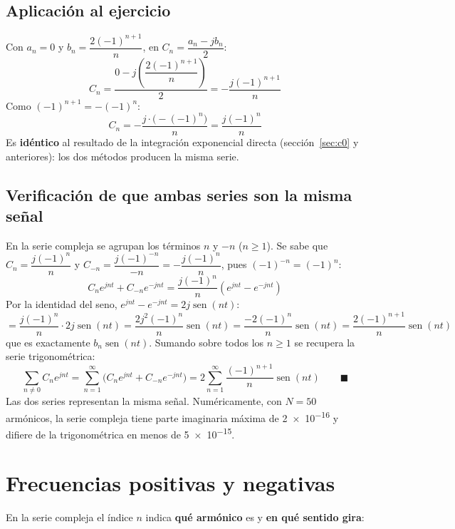 \documentclass[11pt,a4paper]{article}
\DeclareMathOperator{\sen}{sen}
\begin{document}
\subsection{Aplicación al ejercicio}
Con $a_n=0$ y $b_n=\dfrac{2(-1)^{n+1}}{n}$, en $C_n=\dfrac{a_n-jb_n}{2}$:
\begin{equation*}
  C_n=\frac{0-j\left(\dfrac{2(-1)^{n+1}}{n}\right)}{2}=-\frac{j(-1)^{n+1}}{n}
\end{equation*}
Como $(-1)^{n+1}=-(-1)^{n}$:
\begin{equation*}
  C_n=-\frac{j\cdot\big(-(-1)^{n}\big)}{n}=\boxed{\frac{j(-1)^{n}}{n}}
\end{equation*}
Es \textbf{idéntico} al resultado de la integración exponencial directa
(sección~\ref{sec:c0} y anteriores): los dos métodos producen la misma serie.

\subsection{Verificación de que ambas series son la misma señal}
En la serie compleja se agrupan los términos $n$ y $-n$ ($n\ge 1$). Se sabe que
$C_n=\dfrac{j(-1)^{n}}{n}$ y
$C_{-n}=\dfrac{j(-1)^{-n}}{-n}=-\dfrac{j(-1)^{n}}{n}$, pues $(-1)^{-n}=(-1)^{n}$:
\begin{equation*}
  C_ne^{jnt}+C_{-n}e^{-jnt}=\frac{j(-1)^{n}}{n}\left(e^{jnt}-e^{-jnt}\right)
\end{equation*}
Por la identidad del seno, $e^{jnt}-e^{-jnt}=2j\sen(nt)$:
\begin{equation*}
  =\frac{j(-1)^{n}}{n}\cdot 2j\sen(nt)
  =\frac{2j^{2}(-1)^{n}}{n}\sen(nt)
  =\frac{-2(-1)^{n}}{n}\sen(nt)
  =\frac{2(-1)^{n+1}}{n}\sen(nt)
\end{equation*}
que es exactamente $b_n\sen(nt)$. Sumando sobre todos los $n\ge 1$ se recupera la serie
trigonométrica:
\begin{equation*}
  \sum_{n\neq 0}C_ne^{jnt}=\sum_{n=1}^{\infty}\Big(C_ne^{jnt}+C_{-n}e^{-jnt}\Big)
  =2\sum_{n=1}^{\infty}\frac{(-1)^{n+1}}{n}\sen(nt)\qquad\blacksquare
\end{equation*}
Las dos series representan la misma señal. Numéricamente, con $N=50$ armónicos, la serie
compleja tiene parte imaginaria máxima de \num{2e-16} y difiere de la trigonométrica en
menos de \num{5e-15}.

\FloatBarrier
\section{Frecuencias positivas y negativas}\label{sec:frecuencias}
En la serie compleja el índice $n$ indica \textbf{qué armónico} es y \textbf{en qué
sentido gira}:
\end{document}
